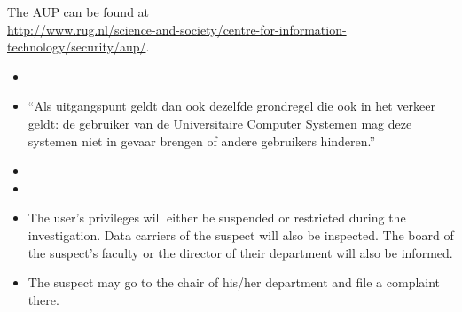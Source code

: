 The AUP can be found at \hfill \\ \url{http://www.rug.nl/science-and-society/centre-for-information-technology/security/aup/}.
\begin{itemize}
	\item 
	\item ``Als uitgangspunt geldt dan ook dezelfde grondregel die ook in het verkeer geldt: de gebruiker van de Universitaire Computer Systemen mag deze systemen niet in gevaar brengen of andere gebruikers hinderen.''
	\item 
	\item 
	\item The user's privileges will either be suspended or restricted during the investigation. Data carriers of the suspect will also be inspected. The board of the suspect's faculty or the director of their department will also be informed.
	\item The suspect may go to the chair of his/her department and file a complaint there.
\end{itemize}